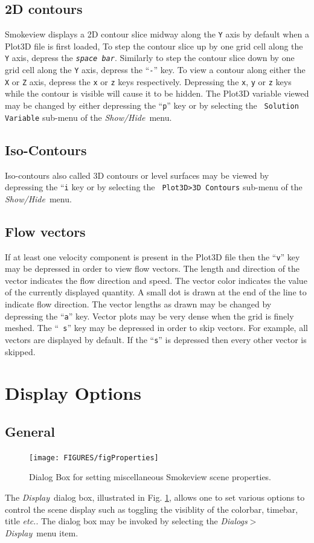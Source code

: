 \documentclass[11pt,twoside]{book}
\begin{document}
\subsection{2D contours}
Smokeview displays a 2D contour slice midway along the {\tt Y}
axis by default when a Plot3D file is first loaded, To step the
contour slice up by one grid cell along the {\tt Y} axis, depress
the {\em\tt space bar}. Similarly to step the contour slice down
by one grid cell along the {\tt Y} axis, depress the ``{\tt -}''
key. To view a contour along either the {\tt X} or {\tt Z} axis,
depress the {\tt x} or {\tt z} keys respectively.  Depressing the
{\tt x}, {\tt y} or {\tt z} keys while the contour is visible will
cause it to be hidden. The Plot3D variable viewed may be changed
by either depressing the ``{\tt p}'' key or by selecting the {\tt
Solution Variable} sub-menu of the {\em Show/Hide}\ menu.

\subsection{Iso-Contours}Iso-contours also called 3D contours or level surfaces may be
viewed by depressing the ``{\tt i} key or by selecting the {\tt
Plot3D>3D Contours} sub-menu of the {\em Show/Hide}\ menu.

\subsection{Flow vectors}If at least one velocity component is present in the Plot3D
file then the ``{\tt v}'' key may be depressed in order to view
flow  vectors. The length and direction of the vector indicates
the flow direction and speed. The vector color indicates the value
of the currently displayed quantity. A small dot is drawn at the
end of the line to indicate flow direction. The vector lengths as
drawn may be changed by depressing the ``{\tt a}'' key. Vector
plots may be very dense when the grid is finely meshed. The ``{\tt
s}'' key may be depressed in order to skip vectors.  For example,
all vectors are displayed by default.  If the ``{\tt s}'' is
depressed then every other vector is skipped.

\section{Display Options}
\subsection{General}
\begin{figure}[\figoptions]
\centerline{\texttt{[image: FIGURES/figProperties]}
} \caption [Dialog Box for setting miscellaneous Smokeview scene
properties.] {Dialog Box for setting miscellaneous Smokeview scene
properties.} \label{figProperties}
\end{figure}
The {\em Display}\ dialog box, illustrated in Fig.
\ref{figProperties}, allows one to set various options to control
the scene display such as toggling the visiblity of the colorbar, timebar, title {\em etc.}.  The  dialog box may be
invoked by selecting the {\em Dialogs$>$Display}\ menu item.
\end{document}
